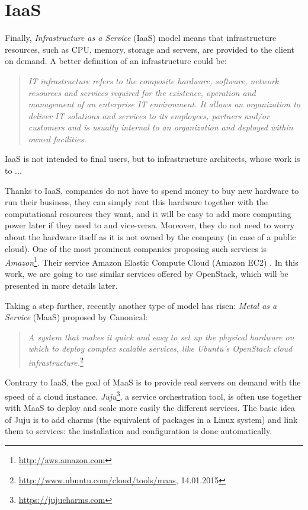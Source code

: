 \section{IaaS}
Finally, \textit{Infrastructure as a Service} (IaaS) model means that infrastructure resources, such as CPU, memory, storage and servers, are provided to the client on demand. A better definition of an infrastructure could be:
\begin{quotation}
\textit{
IT infrastructure refers to the composite hardware, software, network resources and services required for the existence, operation and management of an enterprise IT environment. It allows an organization to deliver IT solutions and services to its employees, partners and/or customers and is usually internal to an organization and deployed within owned facilities.
}\cite{cjanssen14}
\end{quotation}

IaaS is not intended to final users, but to infrastructure architects, whose work is to ...

Thanks to IaaS, companies do not have to spend money to buy new hardware to run their business, they can simply rent this hardware together with the computational resources they want, and it will be easy to add more computing power later if they need to and vice-versa. 
Moreover, they do not need to worry about the hardware itself as it is not owned by the company (in case of a public cloud). 
One of the most prominent companies proposing such services is \textit{Amazon}\footnote{\url{http://aws.amazon.com}}. 
Their service Amazon Elastic Compute Cloud (Amazon EC2) . 
In this work, we are going to use similar services offered by OpenStack, which will be presented in more details later.

Taking a step further, recently another type of model has risen: \textit{Metal as a Service} (MaaS) proposed by Canonical:
\begin{quotation}
\textit{A system that makes it quick and easy to set up the physical hardware on which to deploy complex scalable services, like Ubuntu’s OpenStack cloud infrastructure.}\footnote{\url{http://www.ubuntu.com/cloud/tools/maas}, 14.01.2015}
\end{quotation}

Contrary to IaaS, the goal of MaaS is to provide real servers on demand with the speed of a cloud instance. \textit{Juju}\footnote{\url{https://jujucharms.com}}, a service orchestration tool, is often use together with MaaS to deploy and scale more easily the different services. The basic idea of Juju is to add charms (the equivalent of packages in a Linux system) and link them to services: the installation and configuration is done automatically.







